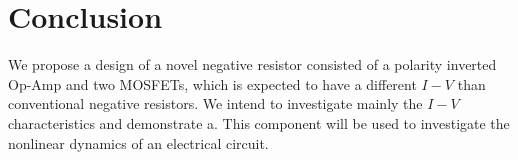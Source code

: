 \documentclass[12pt]{article}
\begin{document}
\section{Conclusion}


\quad We propose a design of a novel negative resistor consisted of a polarity inverted Op-Amp and two MOSFETs, which is expected to have a different \(I-V\) than conventional negative resistors. We intend to investigate mainly the \(I-V\) characteristics and demonstrate a. This component will be used to investigate the nonlinear dynamics of an electrical circuit.


\end{document}
